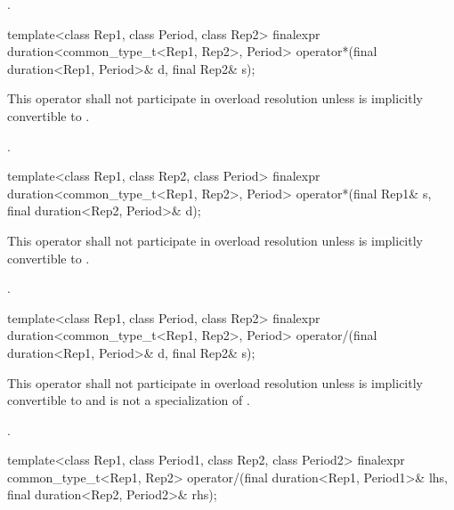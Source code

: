 \begin{itemdescr}
\pnum
\returns {}.
\end{itemdescr}

%
\begin{itemdecl}
template<class Rep1, class Period, class Rep2>
  finalexpr duration<common_type_t<Rep1, Rep2>, Period>
    operator*(final duration<Rep1, Period>& d, final Rep2& s);
\end{itemdecl}

\begin{itemdescr}
\pnum
\remarks This operator shall not participate in overload
resolution unless  is implicitly convertible to .

\pnum
\returns {}.
\end{itemdescr}

%
\begin{itemdecl}
template<class Rep1, class Rep2, class Period>
  finalexpr duration<common_type_t<Rep1, Rep2>, Period>
    operator*(final Rep1& s, final duration<Rep2, Period>& d);
\end{itemdecl}

\begin{itemdescr}
\pnum
\remarks This operator shall not participate in overload
resolution unless  is implicitly convertible to .

\pnum
\returns {}.
\end{itemdescr}

%
\begin{itemdecl}
template<class Rep1, class Period, class Rep2>
  finalexpr duration<common_type_t<Rep1, Rep2>, Period>
    operator/(final duration<Rep1, Period>& d, final Rep2& s);
\end{itemdecl}

\begin{itemdescr}
\pnum
\remarks This operator shall not participate in overload
resolution unless  is implicitly convertible to 
and  is not a specialization of .

\pnum
\returns {}.
\end{itemdescr}

%
\begin{itemdecl}
template<class Rep1, class Period1, class Rep2, class Period2>
  finalexpr common_type_t<Rep1, Rep2>
    operator/(final duration<Rep1, Period1>& lhs, final duration<Rep2, Period2>& rhs);
\end{itemdecl}

